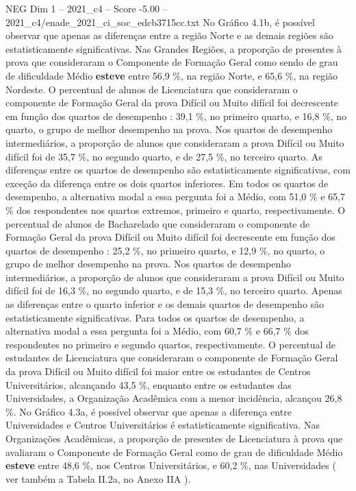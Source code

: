 \begin{textsample}{NEG Dim 1 – 2021\_c4 – Score -5.00 – 2021\_c4/enade\_2021\_ci\_soc\_edcb3715cc.txt}
No Gráfico 4.1b, é possível observar que apenas as diferenças entre a região Norte e as demais regiões são estatisticamente significativas.
Nas Grandes Regiões, a proporção de presentes à prova que consideraram o Componente de Formação Geral como sendo de grau de dificuldade Médio \textbf{esteve} entre 56,9 \%, na região Norte, e 65,6 \%, na região Nordeste.
O percentual de alunos de Licenciatura que consideraram o componente de Formação Geral da prova Difícil ou Muito difícil foi decrescente em função dos quartos de desempenho : 39,1 \%, no primeiro quarto, e 16,8 \%, no quarto, o grupo de melhor desempenho na prova.
Nos quartos de desempenho intermediários, a proporção de alunos que consideraram a prova Difícil ou Muito difícil foi de 35,7 \%, no segundo quarto, e de 27,5 \%, no terceiro quarto.
As diferenças entre os quartos de desempenho são estatisticamente significativas, com exceção da diferença entre os dois quartos inferiores.
Em todos os quartos de desempenho, a alternativa modal a essa pergunta foi a Médio, com 51,0 \% e 65,7 \% dos respondentes nos quartos extremos, primeiro e quarto, respectivamente.
O percentual de alunos de Bacharelado que consideraram o componente de Formação Geral da prova Difícil ou Muito difícil foi decrescente em função dos quartos de desempenho : 25,2 \%, no primeiro quarto, e 12,9 \%, no quarto, o grupo de melhor desempenho na prova.
Nos quartos de desempenho intermediários, a proporção de alunos que consideraram a prova Difícil ou Muito difícil foi de 16,3 \%, no segundo quarto, e de 15,3 \%, no terceiro quarto.
Apenas as diferenças entre o quarto inferior e os demais quartos de desempenho são estatisticamente significativas.
Para todos os quartos de desempenho, a alternativa modal a essa pergunta foi a Médio, com 60,7 \% e 66,7 \% dos respondentes no primeiro e segundo quartos, respectivamente.
O percentual de estudantes de Licenciatura que consideraram o componente de Formação Geral da prova Difícil ou Muito difícil foi maior entre os estudantes de Centros Universitários, alcançando 43,5 \%, enquanto entre os estudantes das Universidades, a Organização Acadêmica com a menor incidência, alcançou 26,8 \%.
No Gráfico 4.3a, é possível observar que apenas a diferença entre Universidades e Centros Universitários é estatisticamente significativa.
Nas Organizações Acadêmicas, a proporção de presentes de Licenciatura à prova que avaliaram o Componente de Formação Geral como de grau de dificuldade Médio \textbf{esteve} entre 48,6 \%, nos Centros Universitários, e 60,2 \%, nas Universidades ( ver também a Tabela II.2a, no Anexo IIA ).

\end{textsample}
